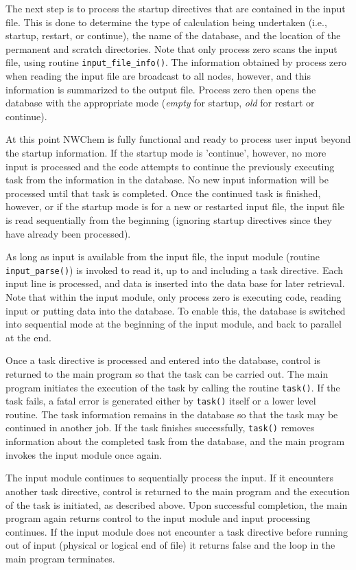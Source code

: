 The next step is to process the startup directives that are contained in the
input file.  This is done to determine the type of calculation being undertaken 
(i.e., startup, restart, or continue), the name of the database, and the 
location of the permanent and scratch directories.  Note that only process zero scans 
the input file, using  routine \verb+input_file_info()+. The information obtained by
process zero when reading the input file are broadcast to all nodes, however, and  
this information is summarized to the output file.  Process zero then
opens the database with the appropriate mode ({\em empty} for startup, {\em old} 
for restart or continue).  

At this point NWChem is fully functional and ready to process user 
input beyond the startup information.
If the startup mode is 'continue', however, no more input is processed and 
the code attempts to continue the 
previously executing task from the information in the database.  No new input information
will be processed until that task is completed.  Once the continued task is finished,
however, or if the startup mode is for a new or restarted input file, 
the input file is read sequentially from the beginning (ignoring 
startup directives since they have already been processed).  

As long as input is  
available from the input file, the input module (routine \verb+input_parse()+) is 
invoked to read it,
up to and including a task directive.  Each input line is processed, and data is
inserted into the data base for 
later retrieval.  Note that within the input module, only process zero is executing 
code, reading input or putting data into the database.  To enable this, the database 
is switched into sequential mode at the beginning of the input module, and back to 
parallel at the end.

Once a task directive is processed and entered into the database, 
control is returned to the main program so that the task can be carried out.
The main program initiates the execution of the task by 
calling the routine \verb+task()+.  If the task fails, a fatal error is generated
either by  
\verb+task()+ itself or a lower level routine.  The task information remains in the database 
so that the task may be continued in another job.  If the task finishes successfully, \verb+task()+ 
removes information about the completed task from the database, and the main program 
invokes the input module once again.

The input module continues to sequentially process the input.  If it encounters another
task directive, control is returned to the main program and the execution of the task
is initiated, as described above.  Upon successful completion, the main program again
returns control to the input module and input processing continues.  If the input 
module does not encounter a task directive before running out of input 
(physical or logical end of file) it returns false and the loop in the main 
program terminates.

